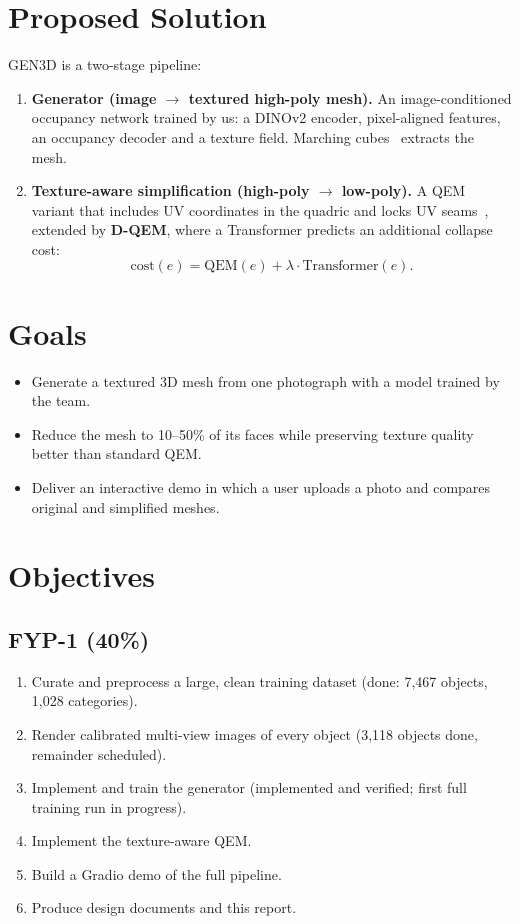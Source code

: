 \section{Proposed Solution}
GEN3D is a two-stage pipeline:
\begin{enumerate}[leftmargin=*]
  \item \textbf{Generator (image $\rightarrow$ textured high-poly mesh).} An image-conditioned occupancy network trained by us: a DINOv2 encoder, pixel-aligned features, an occupancy decoder and a texture field. Marching cubes~\cite{lorensen1987marching} extracts the mesh.
  \item \textbf{Texture-aware simplification (high-poly $\rightarrow$ low-poly).} A QEM variant that includes UV coordinates in the quadric and locks UV seams~\cite{garland1998color}, extended by \textbf{D-QEM}, where a Transformer predicts an additional collapse cost:
  \begin{equation}
    \text{cost}(e) = \text{QEM}(e) + \lambda \cdot \text{Transformer}(e).
  \end{equation}
\end{enumerate}

\section{Goals}
\begin{itemize}[leftmargin=*]
  \item Generate a textured 3D mesh from one photograph with a model trained by the team.
  \item Reduce the mesh to 10--50\% of its faces while preserving texture quality better than standard QEM.
  \item Deliver an interactive demo in which a user uploads a photo and compares original and simplified meshes.
\end{itemize}

\section{Objectives}
\subsection{FYP-1 (40\%)}
\begin{enumerate}[leftmargin=*]
  \item Curate and preprocess a large, clean training dataset (done: 7{,}467 objects, 1{,}028 categories).
  \item Render calibrated multi-view images of every object (3{,}118 objects done, remainder scheduled).
  \item Implement and train the generator (implemented and verified; first full training run in progress).
  \item Implement the texture-aware QEM.
  \item Build a Gradio demo of the full pipeline.
  \item Produce design documents and this report.
\end{enumerate}
